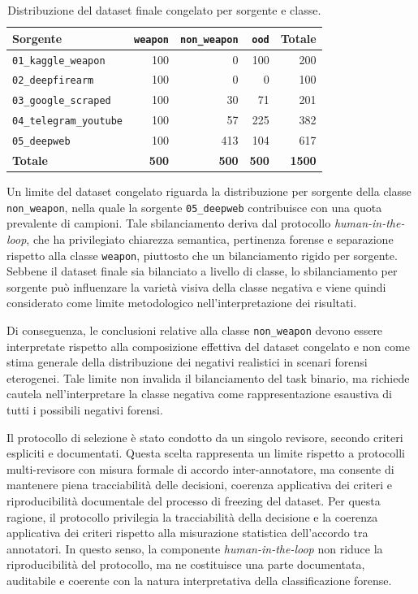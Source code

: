 \begin{table}[H]
\centering
\caption{Distribuzione del dataset finale congelato per sorgente e classe.}
\label{tab:final-dataset-source-distribution}
\begin{tabular}{lrrrr}
\toprule
\textbf{Sorgente} & \textbf{\texttt{weapon}} & \textbf{\texttt{non\_weapon}}
                  & \textbf{\texttt{ood}} & \textbf{Totale} \\
\midrule
\texttt{01\_kaggle\_weapon}    & 100 &   0 & 100 &  200 \\
\texttt{02\_deepfirearm}       & 100 &   0 &   0 &  100 \\
\texttt{03\_google\_scraped}   & 100 &  30 &  71 &  201 \\
\texttt{04\_telegram\_youtube} & 100 &  57 & 225 &  382 \\
\texttt{05\_deepweb}           & 100 & 413 & 104 &  617 \\
\midrule
\textbf{Totale} & \textbf{500} & \textbf{500} & \textbf{500} & \textbf{1500} \\
\bottomrule
\end{tabular}
\end{table}


Un limite del dataset congelato riguarda la distribuzione per sorgente della classe \texttt{non\_weapon},
nella quale la sorgente \texttt{05\_deepweb} contribuisce con una quota prevalente di campioni.
Tale sbilanciamento deriva dal protocollo \textit{human-in-the-loop},
che ha privilegiato chiarezza semantica, pertinenza forense e separazione rispetto alla classe
\texttt{weapon}, piuttosto che un bilanciamento rigido per sorgente. Sebbene il dataset finale sia
bilanciato a livello di classe, lo sbilanciamento per sorgente può influenzare la varietà visiva della
classe negativa e viene quindi considerato come limite metodologico nell'interpretazione dei risultati.

Di conseguenza, le conclusioni relative alla classe \texttt{non\_weapon}
devono essere interpretate rispetto alla composizione effettiva del dataset
congelato e non come stima generale della distribuzione dei negativi realistici
in scenari forensi eterogenei.
Tale limite non invalida il bilanciamento del task binario, ma richiede cautela
nell'interpretare la classe negativa come rappresentazione esaustiva di tutti i
possibili negativi forensi.

Il protocollo di selezione è stato condotto da un singolo revisore, secondo
criteri espliciti e documentati. Questa scelta rappresenta un limite rispetto a
protocolli multi-revisore con misura formale di accordo inter-annotatore, ma
consente di mantenere piena tracciabilità delle decisioni, coerenza applicativa
dei criteri e riproducibilità documentale del processo di freezing del dataset.
Per questa ragione, il protocollo privilegia la tracciabilità della decisione e
la coerenza applicativa dei criteri rispetto alla misurazione statistica
dell'accordo tra annotatori. In questo senso, la componente
\textit{human-in-the-loop} non riduce la riproducibilità del protocollo, ma ne
costituisce una parte documentata, auditabile e coerente con la natura
interpretativa della classificazione forense.


